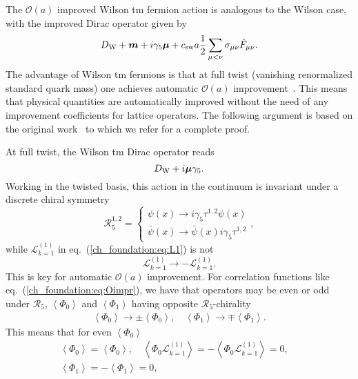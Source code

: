 The $\mathcal{O}(a)$ improved Wilson tm fermion action is analogous to the Wilson case, with the improved Dirac operator given by 
\begin{equation}
D_{\textrm W}+\boldsymbol{m}+i\gamma_5\boldsymbol{\mu}+c_{\textrm{sw}}a\frac{1}{2}\sum_{\mu<\nu}\sigma_{\mu\nu}\hat{F}_{\mu\nu}.
\end{equation}
The advantage of Wilson tm fermions is that at full twist (vanishing renormalized standard quark mass) one achieves automatic $\mathcal{O}(a)$ improvement~\citep{Frezzotti:2003ni,Shindler:2007vp}. This means that physical quantities are automatically improved without the need of any improvement coefficients for lattice operators. The following argument is based on the original work~\citep{Frezzotti:2003ni} to which we refer for a complete proof.

At full twist, the Wilson tm Dirac operator reads
\begin{equation}
D_{\textrm W}+i\boldsymbol{\mu}\gamma_5.
\end{equation}
Working in the twisted basis, this action in the continuum is invariant under a discrete chiral symmetry 
\begin{equation}
\mathcal{R}_5^{1,2}=\left\{\begin{matrix}
\psi(x)\rightarrow i\gamma_5\tau^{1,2}\psi(x) \\ 
\bar{\psi}(x)\rightarrow \bar{\psi}(x)i\gamma_5\tau^{1,2}
\end{matrix}\right.,
\end{equation}
while $\mathcal{L}_{k=1}^{(1)}$ in eq.~(\ref{ch_foundation:eq:L1}) is not 
\begin{equation}
\mathcal{L}_{k=1}^{(1)}\rightarrow-\mathcal{L}_{k=1}^{(1)}.
\end{equation}
This is key for automatic $\mathcal{O}(a)$ improvement. For correlation functions like eq.~(\ref{ch_foundation:eq:Oimpr}), we have that operators may be even or odd under $\mathcal{R}_5$, $\left<\Phi_0\right>$ and $\left<\Phi_1\right>$ having opposite $\mathcal{R}_5$-chirality
\begin{gather}
\left<\Phi_0\right>\rightarrow\pm\left<\Phi_0\right>, \quad \left<\Phi_1\right>\rightarrow\mp\left<\Phi_1\right>.
\end{gather}
This means that for even $\left<\Phi_0\right>$
\begin{gather}
\left<\Phi_0\right>=\left<\Phi_0\right>,
\quad \left<\Phi_0\mathcal{L}^{(1)}_{k=1}\right>=-\left<\Phi_0\mathcal{L}^{(1)}_{k=1}\right>=0, \quad \\ \left<\Phi_1\right>=-\left<\Phi_1\right>=0,
\end{gather}

